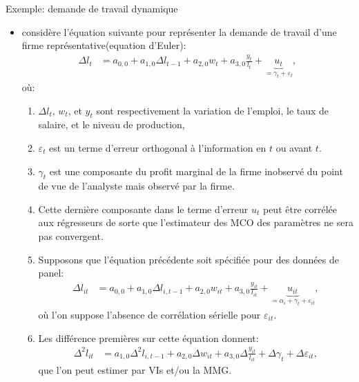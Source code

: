 \begin{frame}
    [allowframebreaks]{Exemple: demande de travail dynamique}
    \begin{itemize}
    \item\cite{Sargent1978} considère l'équation suivante pour représenter la demande de travail 
    d'une firme représentative(equation d'Euler):
    \begin{align*}
        \Delta l_t &= a_{0, 0} +  a_{1, 0}\Delta l_{t-1} + a_{2, 0}w_t+ a_{3, 0}\frac{y_t}{l_t}  
        + \underbrace{u_t}_{= \gamma_t + \varepsilon_t},
    \end{align*}
    où:
    \begin{enumerate}[$\star$]
        \item  $\Delta l_t$, $w_t$, et $y_t$ sont respectivement la variation de l'emploi, le taux de salaire, 
        et le niveau de production, 
        \item $\varepsilon_t$ est un terme d'erreur orthogonal à l'information en $t$ ou avant $t$.
        \item $\gamma_t$ est une composante du profit marginal de la firme inobservé 
        du point de vue de l'analyste mais observé par la firme.
        \item Cette dernière composante dans le terme d'erreur $u_t$ peut être corrélée 
        aux régresseurs de sorte que l'estimateur des MCO des paramètres ne sera pas convergent.
        \item Supposons que l'équation précédente soit spécifiée pour des données de panel:
        \begin{align*}
            \Delta l_{it} &= a_{0, 0} +  a_{1, 0}\Delta l_{i, t-1} + a_{2, 0}w_{it}+ a_{3, 0}\frac{y_{it}}{l_{it}}  
            + \underbrace{u_{it}}_{= \alpha_i + \gamma_{t} + \varepsilon_{it}},
        \end{align*}
        où l'on suppose l'absence de corrélation sérielle pour $\varepsilon_{it}$.
        \item Les différence premières sur cette équation donnent:
        \begin{align*}
            \Delta^2 l_{it} &= a_{1, 0}\Delta^2 l_{i, t-1} + a_{2, 0}\Delta w_{it}+ a_{3, 0}\Delta \frac{y_{it}}{l_{it}} 
            + \Delta \gamma_t + \Delta \varepsilon_{it},
        \end{align*}
        que l'on peut estimer par VIs et/ou la MMG.
    \end{enumerate}

    \end{itemize}
\end{frame}
